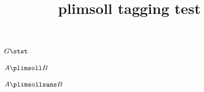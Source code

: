 \documentclass{article}
\title{plimsoll tagging test}
\begin{document}
$G\stst$

$A\plimsoll B$

$A\plimsollsans B$
\end{document}
